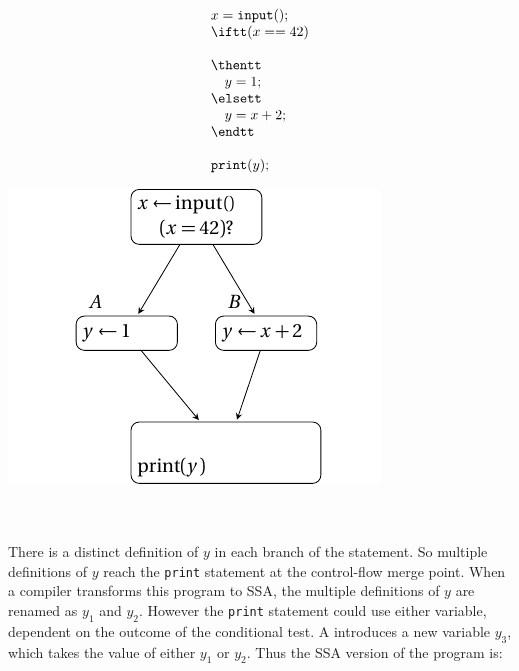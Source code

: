 \begin{minipage}{0.4\textwidth}
\begin{equation*}
\begin{array}{l}
x = \texttt{input}();\\
\iftt (x == 42)\\
\\
\thentt\\
\quad    y = 1;\\
\elsett\\
\quad    y = x+2;\\
\endtt\\
\\
\texttt{print}(y);\\
\end{array}
\end{equation*}
\end{minipage}
\begin{minipage}{0.4\textwidth}
\includegraphics[scale=0.9]{ifthenelse-nonssa.pdf}
\end{minipage}
~\\\\

There is a distinct definition of $y$ in each branch of the \iftt
statement. So multiple definitions of $y$ reach the \texttt{print} statement
at the control-flow merge point. When a compiler transforms this program 
to SSA,
the multiple definitions of $y$ are renamed as $y_1$ and $y_2$. However 
the \texttt{print} statement could use either variable, dependent on the
outcome of the \iftt conditional test. A \phifun introduces
a new variable $y_3$, which takes the value of either $y_1$ or $y_2$.
Thus the SSA version of the program is:

